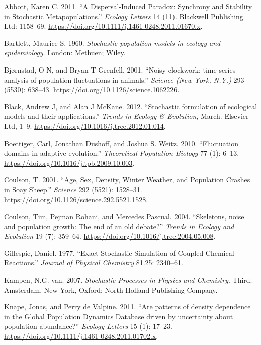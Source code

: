 \documentclass[3p]{elsarticle} %
\begin{document}
\hypertarget{refs}{}
\leavevmode\hypertarget{ref-Abbott2011}{}%
Abbott, Karen C. 2011. ``A Dispersal-Induced Paradox: Synchrony and
Stability in Stochastic Metapopulations.'' \emph{Ecology Letters} 14
(11). Blackwell Publishing Ltd: 1158--69.
\url{https://doi.org/10.1111/j.1461-0248.2011.01670.x}.

\leavevmode\hypertarget{ref-Bartlett1960}{}%
Bartlett, Maurice S. 1960. \emph{Stochastic population models in ecology
and epidemiology}. London: Methuen; Wiley.

\leavevmode\hypertarget{ref-Bjornstad2001}{}%
Bjørnstad, O N, and Bryan T Grenfell. 2001. ``Noisy clockwork: time
series analysis of population fluctuations in animals.'' \emph{Science
(New York, N.Y.)} 293 (5530): 638--43.
\url{https://doi.org/10.1126/science.1062226}.

\leavevmode\hypertarget{ref-Black2012}{}%
Black, Andrew J, and Alan J McKane. 2012. ``Stochastic formulation of
ecological models and their applications.'' \emph{Trends in Ecology \&
Evolution}, March. Elsevier Ltd, 1--9.
\url{https://doi.org/10.1016/j.tree.2012.01.014}.

\leavevmode\hypertarget{ref-Boettiger2010}{}%
Boettiger, Carl, Jonathan Dushoff, and Joshua S. Weitz. 2010.
``Fluctuation domains in adaptive evolution.'' \emph{Theoretical
Population Biology} 77 (1): 6--13.
\url{https://doi.org/10.1016/j.tpb.2009.10.003}.

\leavevmode\hypertarget{ref-Coulson2001}{}%
Coulson, T. 2001. ``Age, Sex, Density, Winter Weather, and Population
Crashes in Soay Sheep.'' \emph{Science} 292 (5521): 1528--31.
\url{https://doi.org/10.1126/science.292.5521.1528}.

\leavevmode\hypertarget{ref-Coulson2004}{}%
Coulson, Tim, Pejman Rohani, and Mercedes Pascual. 2004. ``Skeletons,
noise and population growth: The end of an old debate?'' \emph{Trends in
Ecology and Evolution} 19 (7): 359--64.
\url{https://doi.org/10.1016/j.tree.2004.05.008}.

\leavevmode\hypertarget{ref-Gillespie1977}{}%
Gillespie, Daniel. 1977. ``Exact Stochastic Simulation of Coupled
Chemical Reactions.'' \emph{Journal of Physical Chemistry} 81.25:
2340--61.

\leavevmode\hypertarget{ref-vanKampen2007}{}%
Kampen, N.G. van. 2007. \emph{Stochastic Processes in Physics and
Chemistry}. Third. Amsterdam, New York, Oxford: North-Holland Publishing
Company.

\leavevmode\hypertarget{ref-Knape2011}{}%
Knape, Jonas, and Perry de Valpine. 2011. ``Are patterns of density
dependence in the Global Population Dynamics Database driven by
uncertainty about population abundance?'' \emph{Ecology Letters} 15 (1):
17--23. \url{https://doi.org/10.1111/j.1461-0248.2011.01702.x}.
\end{document}
